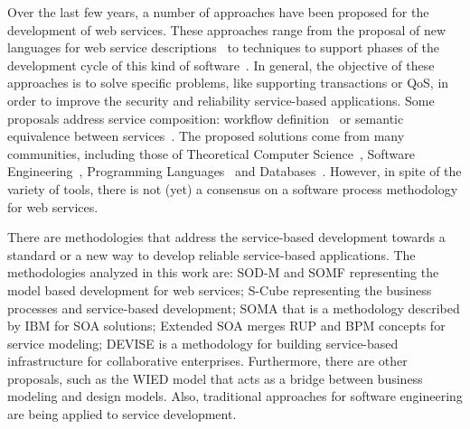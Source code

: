 Over the last few years, a number of approaches have been proposed for the
development of web services. These approaches range from the proposal of new languages for web service
descriptions~\cite{bpel03, MPC08, wscl02, Martin04,SBS04} to techniques to
support phases of the development cycle of this kind of
software~\cite{lipari2007,BianculliGSBG07}. In general, the objective of these
approaches is to solve specific problems, like supporting transactions or
QoS, in order to improve the security and reliability service-based
applications. Some proposals address service composition: workflow
definition~\cite{AalstHKB03,MuP06} or semantic equivalence between
services~\cite{BHM06}. The proposed solutions come from many communities, including those of Theoretical Computer Science~\cite{SBS04,VA05,HamadiB03,AlH01,GGP08}, Software
Engineering~\cite{burdy:05,AalstHKB03,Aal03,choreoWG,MendesPDB09}, Programming
Languages~\cite{MPC08,bpel03} and Databases~\cite{PiresBM02,ABM01}.
However, in spite of the variety of tools, there is not (yet) a consensus on a software
process methodology for web services. 



There are methodologies that address the service-based development towards a
standard or a new way to develop reliable service-based applications. The
methodologies analyzed in this work are: SOD-M \cite{valeriaThesis} and SOMF
\cite{somf} representing the model based development for web services; S-Cube
\cite{scube2010book} representing the business processes and service-based
development; SOMA \cite{soma} that is a methodology described by IBM
for SOA solutions; Extended SOA \cite{PapazoglouH06} merges RUP\cite{rup} and
BPM\cite{bpm} concepts for service modeling; DEVISE \cite{Dhyanesh003} is a
methodology for building service-based infrastructure for collaborative
enterprises. Furthermore, there are other proposals, such as the WIED
model \cite{TongrungrojanaL04} that acts as a bridge between business modeling and
design models. Also, traditional approaches for software engineering
\cite{sommerville08} are being applied to service development.

